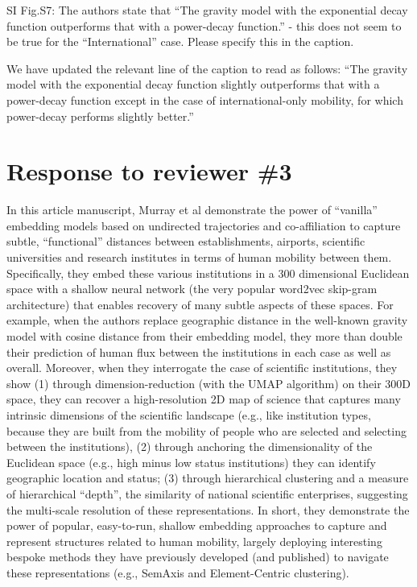 \documentclass[12pt,a4paper]{article}
\newcommand{\response}[1]{{\leavevmode\noindent #1}}
\newcommand{\rcomment}[1]{%
\vspace{10pt}
\begin{tcolorbox}[colback=black!3,colframe=white!45!black]
#1
\end{tcolorbox}
}
\begin{document}
\rcomment{

SI Fig.S7: The authors state that “The gravity model with the exponential decay function outperforms that with a power-decay function.” - this does not seem to be true for the “International” case. Please specify this in the caption.


}
\response{
We have updated the relevant line of the caption to read as follows: 
“The gravity model with the exponential decay function slightly outperforms that with a power-decay function except in the case of international-only mobility, for which power-decay performs slightly better.”

}

\section*{Response to reviewer \#3}

\rcomment{%
In this article manuscript, Murray et al demonstrate the power of “vanilla” embedding models based on undirected trajectories and co-affiliation to capture subtle, “functional” distances between establishments, airports, scientific universities and research institutes in terms of human mobility between them. Specifically, they embed these various institutions in a 300 dimensional Euclidean space with a shallow neural network (the very popular word2vec skip-gram architecture) that enables recovery of many subtle aspects of these spaces. For example, when the authors replace geographic distance in the well-known gravity model with cosine distance from their embedding model, they more than double their prediction of human flux between the institutions in each case as well as overall. Moreover, when they interrogate the case of scientific institutions, they show (1) through dimension-reduction (with the UMAP algorithm) on their 300D space, they can recover a high-resolution 2D map of science that captures many intrinsic dimensions of the scientific landscape (e.g., like institution types, because they are built from the mobility of people who are selected and selecting between the institutions), (2) through anchoring the dimensionality of the Euclidean space (e.g., high minus low status institutions) they can identify geographic location and status; (3) through hierarchical clustering and a measure of hierarchical “depth”, the similarity of national scientific enterprises, suggesting the multi-scale resolution of these representations. In short, they demonstrate the power of popular, easy-to-run, shallow embedding approaches to capture and represent structures related to human mobility, largely deploying interesting bespoke methods they have previously developed (and published) to navigate these representations (e.g., SemAxis and Element-Centric clustering).
}
\end{document}
